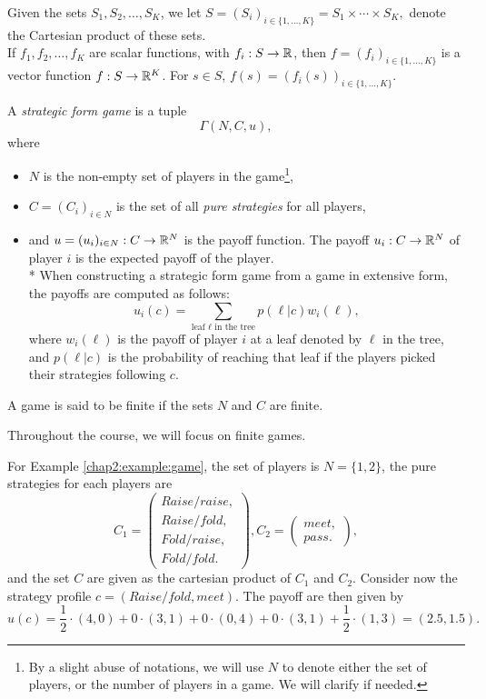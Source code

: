 \begin{notation}
Given the sets $S_1, S_2, \ldots, S_K$, we let 
$S = (S_i)_{i \in \{1, \ldots, K\}} = S_1 \times \cdots \times S_K, $ denote the Cartesian product of these sets.\\
If $f_1, f_2, \ldots, f_K$ are scalar functions, with $f_i : S \rightarrow \mathbb{R}$,  
then $f = (f_i)_{i \in \{1,\ldots, K\}}$ is a vector function $f : S \rightarrow \mathbb{R}^K$.
For $s  \in S$,  
$f(s) = (f_i(s))_{i \in \{1, \ldots, K\}}.$
\end{notation}
\begin{definition}
A \emph{strategic form game} is a tuple 
$$ \Gamma(N, C, u),$$
where
\begin{itemize}
\item $N$ is the non-empty set of players in the game\footnote{By a slight abuse of notations, we will use $N$ to denote either the set of players, or the number of players in a game. We will clarify if needed.},
\item $C = (C_i)_{i \in N}$ is the set of all \emph{pure strategies} for all players,
\item and $u = (u_i)_{i \in N} : C \rightarrow \mathbb{R}^N$ is the payoff function.
The payoff $u_i : C \rightarrow \mathbb{R}^N$ of player $i$
is the expected payoff of the player. \\*
When constructing a strategic form game from a game in extensive form, the payoffs are computed as follows:
$$u_i(c) = \sum_{\text{leaf $\ell$ in the tree}} p(\ell|c) w_i(\ell), $$
where $w_i(\ell)$ is the payoff of player $i$ at a leaf denoted by $\ell$ in the tree, and $p(\ell|c)$ is the probability of reaching that leaf if the players picked their strategies following $c$.
\end{itemize}
A game is said to be finite if the sets $N$ and $C$ are finite.
\end{definition}
Throughout the course, we will focus on finite games.
\begin{example}
For Example \ref{chap2:example:game}, the set of players is $N = \{1,2\}$,
the pure strategies for each players are 
 $$C_1 = \begin{pmatrix}
Raise/raise, \\
Raise/fold, \\
Fold/raise, \\
Fold/fold.
\end{pmatrix}, C_2 = \begin{pmatrix}
meet,\\
pass.
\end{pmatrix},$$
and the set $C$ are given as the cartesian product of $C_1$ and $C_2$.
Consider now the strategy profile $c = (Raise/fold, meet)$.
The payoff are then given by 
$$u(c) = \frac{1}{2} \cdot (4,0) + 0 \cdot (3,1)+ 0 \cdot (0,4) + 0 \cdot (3,1) + \frac{1}{2} \cdot (1,3) = (2.5,1.5).$$  
\end{example}

